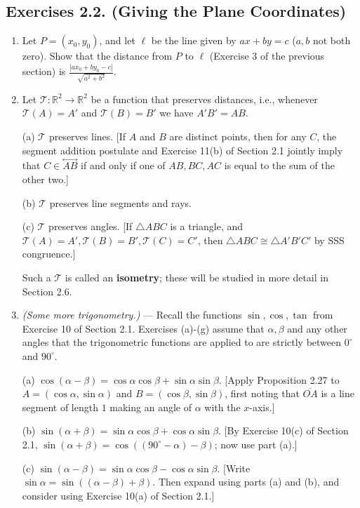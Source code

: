 \documentclass[leqno]{book}
\begin{document}
\subsection*{Exercises 2.2. (Giving the Plane Coordinates)}
\begin{enumerate}
\item Let $P=(x_0,y_0)$, and let $\ell$ be the line given by $ax+by=c$ ($a,b$ not both zero).  Show that the distance from $P$ to $\ell$ (Exercise 3 of the previous section) is $\frac{|ax_0+by_0-c|}{\sqrt{a^2+b^2}}$.

\item Let $\mathcal T:\mathbb R^2\to\mathbb R^2$ be a function that preserves distances, i.e., whenever $\mathcal T(A)=A'$ and $\mathcal T(B)=B'$ we have $A'B'=AB$.

(a) $\mathcal T$ preserves lines.  [If $A$ and $B$ are distinct points, then for any $C$, the segment addition postulate and Exercise 11(b) of Section 2.1 jointly imply that $C\in\overset{\longleftrightarrow}{AB}$ if and only if one of $AB,BC,AC$ is equal to the sum of the other two.]

(b) $\mathcal T$ preserves line segments and rays.

(c) $\mathcal T$ preserves angles.  [If $\triangle ABC$ is a triangle, and $\mathcal T(A)=A',\mathcal T(B)=B',\mathcal T(C)=C'$, then $\triangle ABC\cong\triangle A'B'C'$ by SSS congruence.]

Such a $\mathcal T$ is called an \textbf{isometry}; these will be studied in more detail in Section 2.6.

\item\emph{(Some more trigonometry.)} \---- Recall the functions $\sin,\cos,\tan$ from Exercise 10 of Section 2.1.  Exercises (a)-(g) assume that $\alpha,\beta$ and any other angles that the trigonometric functions are applied to are strictly between $0^\circ$ and $90^\circ$.

(a) $\cos(\alpha-\beta)=\cos\alpha\cos\beta+\sin\alpha\sin\beta$. [Apply Proposition 2.27 to $A=(\cos\alpha,\sin\alpha)$ and $B=(\cos\beta,\sin\beta)$, first noting that $\overline{OA}$ is a line segment of length $1$ making an angle of $\alpha$ with the $x$-axis.]

(b) $\sin(\alpha+\beta)=\sin\alpha\cos\beta+\cos\alpha\sin\beta$. [By Exercise 10(c) of Section 2.1, $\sin(\alpha+\beta)=\cos((90^\circ-\alpha)-\beta)$; now use part (a).]

(c) $\sin(\alpha-\beta)=\sin\alpha\cos\beta-\cos\alpha\sin\beta$.  [Write $\sin\alpha=\sin((\alpha-\beta)+\beta)$.  Then expand using parts (a) and (b), and consider using Exercise 10(a) of Section 2.1.]


\end{enumerate}
\end{document}
